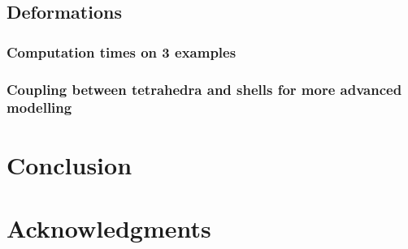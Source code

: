 \documentclass{llncs}
\begin{document}
\subsection{Deformations}
\subsubsection{Computation times on 3 examples}
\subsubsection{Coupling between tetrahedra and shells for more advanced modelling}

\section{Conclusion}
\section*{Acknowledgments}



\end{document}

